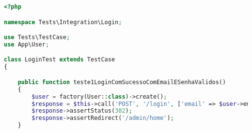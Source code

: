 \begin{lstlisting}[language=PHP, caption= Cenários de Testes Automatizados de Integração do Login,label={code:logintest}]
<?php

namespace Tests\Integration\Login;

use Tests\TestCase;
use App\User;

class LoginTest extends TestCase
{

    public function teste1LoginComSucessoComEmailESenhaValidos()
    {
        $user = factory(User::class)->create();
        $response = $this->call('POST', '/login', ['email' => $user->email, 'password' => 'teste@123']);
        $response->assertStatus(302);
        $response->assertRedirect('/admin/home');
    }
    
\end{lstlisting}

